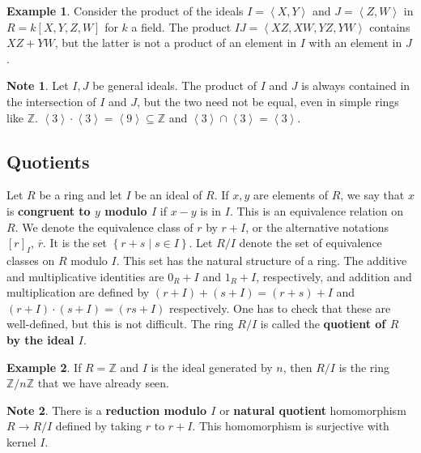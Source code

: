 \documentclass{article}
\newcommand{\Z}{\mathbb{Z}}
\newcommand{\rb}[1]{\left( #1 \right)}
\renewcommand{\sb}[1]{\left[ #1 \right]}
\newcommand{\cb}[1]{\left\{ #1 \right\}}
\newcommand{\ab}[1]{\left\langle #1 \right\rangle}
\theoremstyle{definition}\newtheorem{definition}{Definition}[subsection]
\theoremstyle{definition}\newtheorem{remark}[definition]{Remark}
\theoremstyle{definition}\newtheorem*{example}{Example}
\theoremstyle{definition}\newtheorem*{note}{Note}
\begin{document}
\begin{example}
Consider the product of the ideals $ I = \ab{X, Y} $ and $ J = \ab{Z, W} $ in $ R = k\sb{X, Y, Z, W} $ for $ k $ a field. The product $ IJ = \ab{XZ, XW, YZ, YW} $ contains $ XZ + YW $, but the latter is not a product of an element in $ I $ with an element in $ J $.
\end{example}

\begin{note}
Let $ I, J $ be general ideals. The product of $ I $ and $ J $ is always contained in the intersection of $ I $ and $ J $, but the two need not be equal, even in simple rings like $ \Z $. $ \ab{3} \cdot \ab{3} = \ab{9} \subseteq \Z $ and $ \ab{3} \cap \ab{3} = \ab{3} $.
\end{note}

\subsection{Quotients}

Let $ R $ be a ring and let $ I $ be an ideal of $ R $. If $ x, y $ are elements of $ R $, we say that $ x $ is \textbf{congruent to $ y $ modulo $ I $} if $ x - y $ is in $ I $. This is an equivalence relation on $ R $. We denote the equivalence class of $ r $ by $ r + I $, or the alternative notations $ \sb{r}_I $, $ \overline{r} $. It is the set $ \cb{r + s \mid s \in I} $. Let $ R / I $ denote the set of equivalence classes on $ R $ modulo $ I $. This set has the natural structure of a ring. The additive and multiplicative identities are $ 0_R + I $ and $ 1_R + I $, respectively, and addition and multiplication are defined by $ \rb{r + I} + \rb{s + I} = \rb{r + s} + I $ and $ \rb{r + I} \cdot \rb{s + I} = \rb{rs + I} $ respectively. One has to check that these are well-defined, but this is not difficult. The ring $ R / I $ is called the \textbf{quotient of $ R $ by the ideal $ I $}.

\begin{example}
If $ R = \Z $ and $ I $ is the ideal generated by $ n $, then $ R / I $ is the ring $ \Z / n\Z $ that we have already seen.
\end{example}

\begin{note}
There is a \textbf{reduction modulo $ I $} or \textbf{natural quotient} homomorphism $ R \to R / I $ defined by taking $ r $ to $ r + I $. This homomorphism is surjective with kernel $ I $.
\end{note}
\end{document}
